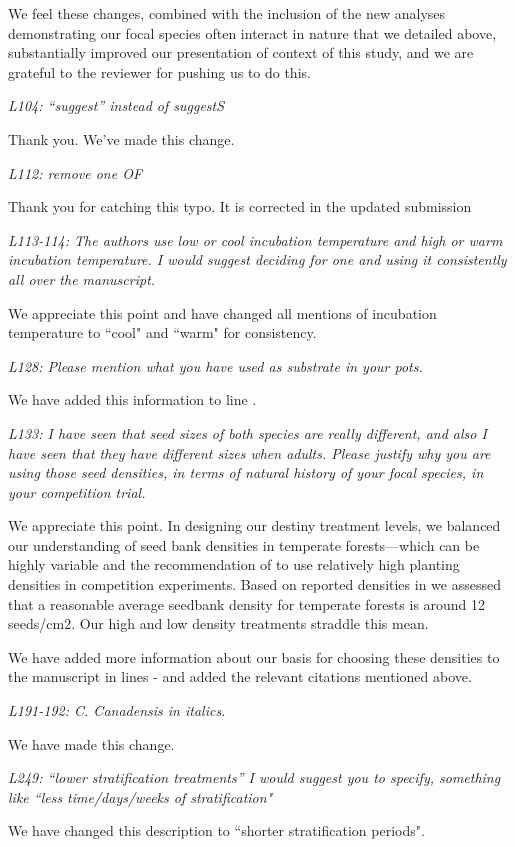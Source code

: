 \documentclass[11pt]{article}
\begin{document}
We feel these changes, combined with the inclusion of the new analyses demonstrating our focal species often interact in nature that we detailed above, substantially improved our presentation of context of this study, and we are grateful to the reviewer for pushing us to do this.

\emph{L104: “suggest” instead of suggestS}

Thank you. We've made this change.

\emph{L112: remove one OF}

Thank you for catching this typo. It is corrected in the updated submission

\emph{L113-114: The authors use low or cool incubation temperature and high or warm incubation temperature. I would suggest deciding for one and using it consistently all over the manuscript.}

We appreciate this point and have changed all mentions of incubation temperature to ``cool" and ``warm" for consistency. 

\emph{L128: Please mention what you have used as substrate in your pots.}

We have added this information to line . 

\emph{L133: I have seen that seed sizes of both species are really different, and also I have seen that they have different sizes when adults. Please justify why you are using those seed densities, in terms of natural history of your focal species, in your competition trial.}

We appreciate this point. In designing our destiny treatment levels, we balanced our understanding of seed bank densities in temperate forests---which can be highly variable \citep{Leckie:2000tb,Bossuyt:2002un,Decocq:2004tq} and the recommendation of \citet{Inouye2001} to use relatively high planting densities in competition experiments. Based on reported densities in \citet{Leckie:2000tb,Bossuyt:2002un,Decocq:2004tq} we assessed that a reasonable average seedbank density for temperate forests is around 12 seeds/cm2. Our high and low density treatments straddle this mean.

We have added more information about our basis for choosing these densities to the manuscript in lines - and added the relevant citations mentioned above.


\emph{L191-192: C. Canadensis in italics.}

We have made this change.

\emph{L249: “lower stratification treatments” I would suggest you to specify, something like ``less time/days/weeks of stratification"}

We have changed this description to ``shorter stratification periods".


\end{document}
